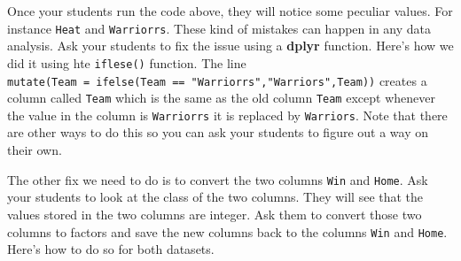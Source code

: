 \documentclass[]{book}
\newenvironment{Shaded}{\begin{snugshade}}{\end{snugshade}}
\newcommand{\CommentTok}[1]{\textcolor[rgb]{0.56,0.35,0.01}{\textit{#1}}}
\newcommand{\DataTypeTok}[1]{\textcolor[rgb]{0.13,0.29,0.53}{#1}}
\newcommand{\KeywordTok}[1]{\textcolor[rgb]{0.13,0.29,0.53}{\textbf{#1}}}
\newcommand{\NormalTok}[1]{#1}
\newcommand{\OperatorTok}[1]{\textcolor[rgb]{0.81,0.36,0.00}{\textbf{#1}}}
\newcommand{\StringTok}[1]{\textcolor[rgb]{0.31,0.60,0.02}{#1}}
\begin{document}
Once your students run the code above, they will notice some peculiar values. For instance \texttt{\textquotesingle{}Heat\textquotesingle{}} and \texttt{Warriorrs}. These kind of mistakes can happen in any data analysis. Ask your students to fix the issue using a \textbf{dplyr} function. Here's how we did it using hte \texttt{iflese()} function. The line \texttt{mutate(Team\ =\ ifelse(Team\ ==\ "Warriorrs","Warriors",Team))} creates a column called \texttt{Team} which is the same as the old column \texttt{Team} except whenever the value in the column is \texttt{Warriorrs} it is replaced by \texttt{Warriors}. Note that there are other ways to do this so you can ask your students to figure out a way on their own.

The other fix we need to do is to convert the two columns \texttt{Win} and \texttt{Home}. Ask your students to look at the class of the two columns. They will see that the values stored in the two columns are integer. Ask them to convert those two columns to factors and save the new columns back to the columns \texttt{Win} and \texttt{Home}. Here's how to do so for both datasets.

\begin{Shaded}
\end{Shaded}
\end{document}
